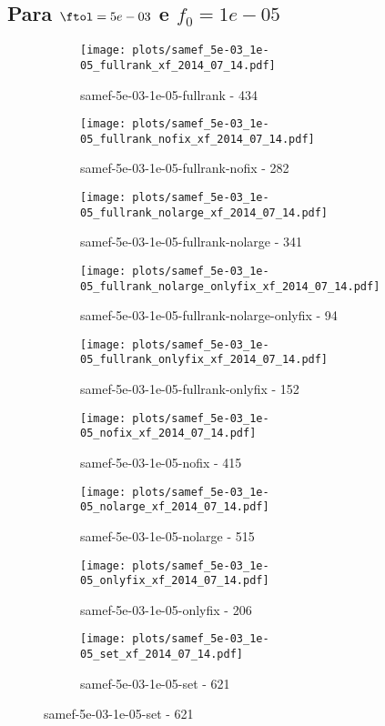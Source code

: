 \newpage
\subsection{Para $\ftol = 5e-03$ e $f_0 = 1e-05$}

\begin{figure}[H]
  \centering
  \begin{subfigure}{0.48\textwidth}
    \texttt{[image: plots/samef\_5e-03\_1e-05\_fullrank\_xf\_2014\_07\_14.pdf]}
    \caption{samef-5e-03-1e-05-fullrank - 434}
  \end{subfigure}
  \begin{subfigure}{0.48\textwidth}
    \texttt{[image: plots/samef\_5e-03\_1e-05\_fullrank\_nofix\_xf\_2014\_07\_14.pdf]}
    \caption{samef-5e-03-1e-05-fullrank-nofix - 282}
  \end{subfigure}
  \begin{subfigure}{0.48\textwidth}
    \texttt{[image: plots/samef\_5e-03\_1e-05\_fullrank\_nolarge\_xf\_2014\_07\_14.pdf]}
    \caption{samef-5e-03-1e-05-fullrank-nolarge - 341}
  \end{subfigure}
  \begin{subfigure}{0.48\textwidth}
    \texttt{[image: plots/samef\_5e-03\_1e-05\_fullrank\_nolarge\_onlyfix\_xf\_2014\_07\_14.pdf]}
    \caption{samef-5e-03-1e-05-fullrank-nolarge-onlyfix - 94}
  \end{subfigure}
  \begin{subfigure}{0.48\textwidth}
    \texttt{[image: plots/samef\_5e-03\_1e-05\_fullrank\_onlyfix\_xf\_2014\_07\_14.pdf]}
    \caption{samef-5e-03-1e-05-fullrank-onlyfix - 152}
  \end{subfigure}
  \begin{subfigure}{0.48\textwidth}
    \texttt{[image: plots/samef\_5e-03\_1e-05\_nofix\_xf\_2014\_07\_14.pdf]}
    \caption{samef-5e-03-1e-05-nofix - 415}
  \end{subfigure}
  \begin{subfigure}{0.48\textwidth}
    \texttt{[image: plots/samef\_5e-03\_1e-05\_nolarge\_xf\_2014\_07\_14.pdf]}
    \caption{samef-5e-03-1e-05-nolarge - 515}
  \end{subfigure}
  \begin{subfigure}{0.48\textwidth}
    \texttt{[image: plots/samef\_5e-03\_1e-05\_onlyfix\_xf\_2014\_07\_14.pdf]}
    \caption{samef-5e-03-1e-05-onlyfix - 206}
  \end{subfigure}
  \begin{subfigure}{0.48\textwidth}
    \texttt{[image: plots/samef\_5e-03\_1e-05\_set\_xf\_2014\_07\_14.pdf]}
    \caption{samef-5e-03-1e-05-set - 621}
  \end{subfigure}
\end{figure}


